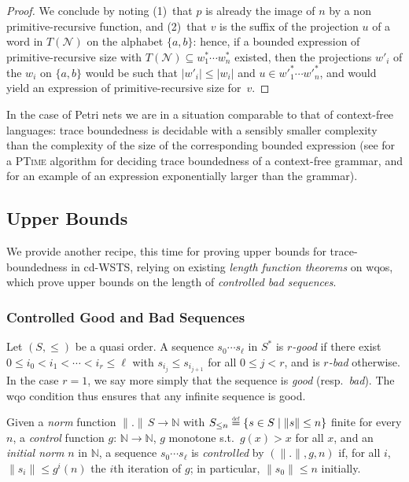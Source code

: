 \documentclass[11pt,reqno,a4paper]{amsart}
\newcommand{\eqdef}{\stackrel{\raisebox{-.15ex}{\scalebox{.5}{\upshape\textrm{def}}}}{=}}
\newcommand{\norm}[1]{\|#1\|}
\theoremstyle{plain}
\theoremstyle{definition}
\theoremstyle{remark}
\renewcommand{\paragraph}{\subsubsection*}
\begin{document}
\begin{proof}
We conclude by noting (1)~that $p$ is already the image of $n$ by a non
primitive-recursive function, and (2)~that $v$ is the suffix of the
projection $u$ of a word in $T(\mathcal{N})$ on the alphabet
$\{a,b\}$: hence, if a bounded expression of primitive-recursive size with
$T(\mathcal{N})\subseteq w_1^\ast\cdots w_n^\ast$ existed, then
the projections $w'_i$ of the $w_i$ on $\{a,b\}$ would be such that
$|w'_i|\leq|w_i|$ and $u\in {w'}_1^\ast\cdots {w'}_n^\ast$, and would
yield an expression of primitive-recursive size for~$v$.
\end{proof}

In the case of Petri nets we are in a situation comparable to
that of context-free languages: trace boundedness is decidable with a
sensibly smaller complexity than the complexity of the size of the
corresponding bounded expression (see \citet{growthrate} for a
\textsc{PTime} algorithm for deciding trace boundedness of a context-free
grammar, and \citet{noteslre} for an example of an expression
exponentially larger than the grammar).

\subsection{Upper Bounds}\label{sub:ubound}
We provide another recipe, this time for proving upper bounds for
trace-boundedness in cd-WSTS, relying on existing \emph{length
  function theorems} on wqos, which prove upper bounds on the length of
\emph{controlled bad sequences}.

\paragraph{Controlled Good and Bad Sequences}
Let $(S,\leq)$ be a quasi order.  A sequence $s_0\cdots s_\ell$ in
$S^\ast$ is \emph{$r$-good} if there exist $0\leq i_0<i_1<\cdots<i_r\leq \ell$ with
$s_{i_j}\leq s_{i_{j+1}}$ for all $0\leq j<r$, and is \emph{$r$-bad}
otherwise.  In the case $r=1$, we say more simply that the sequence is
\emph{good} (resp.\ \emph{bad}).  The wqo condition thus
ensures that any infinite sequence is good.

Given a \emph{norm} function $\norm{.}\,S\to\mathbb{N}$ with $S_{\leq
  n}\eqdef\{s\in S\mid \norm{s}\leq n\}$ finite for every $n$, a
\emph{control} function $g{:}\,\mathbb{N}\to\mathbb{N}$, $g$ monotone
s.t.\ $g(x)>x$ for all $x$, and an \emph{initial norm} $n$ in
$\mathbb{N}$, a sequence $s_0\cdots s_\ell$ is \emph{controlled} by
$(\norm{.},g,n)$ if, for all $i$, $\norm{s_i}\leq g^i(n)$ the $i$th
iteration of $g$; in particular, $\norm{s_0}\leq n$ initially.
\end{document}

